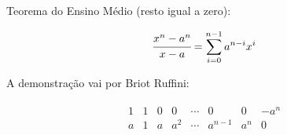 \documentclass[12pt]{article}
\begin{document}
Teorema do Ensino M\'edio (resto igual a zero): 

\begin{align}
\cfrac{x^n - a^n}{x - a} = \sum_{i = 0}^{n - 1} a^{n-i} x^i
\end{align}

A demonstra\c{c}\~ao vai por Briot Ruffini:

\begin{align}
\begin{matrix} 1 & 1 & 0 & 0 & \cdots & 0 & 0 & - a^n \\ a & 1 & a & a^2 & \cdots & a^{n - 1} & a^n & 0
\end{matrix}
\end{align}
\end{document}
